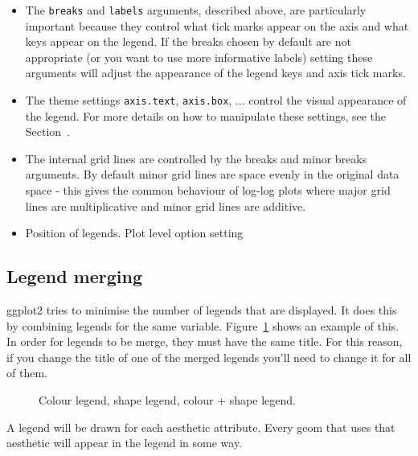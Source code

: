 \begin{itemize}
  \item The {\tt breaks} and {\tt labels} arguments, described above, are particularly important because they control what tick marks appear on the axis and what keys appear on the legend.  If the breaks chosen by default are not appropriate (or you want to use more informative labels) setting these arguments will adjust the appearance of the legend keys and axis tick marks.  
  
  \item The theme settings {\tt axis.text}, {\tt axis.box}, ... control the visual appearance of the legend.  For more details on how to manipulate these settings, see the Section~.

  \item The internal grid lines are controlled by the breaks and minor breaks arguments.  By default minor grid lines are space evenly in the original data space - this gives the common behaviour of log-log plots where major grid lines are multiplicative and minor grid lines are additive.
  
  \item Position of legends.  Plot level option setting 
  
\end{itemize}

\subsection{Legend merging}

ggplot2 tries to minimise the number of legends that are displayed.  It does this by combining legends for the same variable.  Figure~\ref{fig:legend-merge} shows an example of this.  In order for legends to be merge, they must have the same title.  For this reason, if you change the title of one of the merged legends you'll need to change it for all of them.

\begin{figure}[htbp]
  \centering
  \caption{Colour legend, shape legend, colour + shape legend.}
  \label{fig:legend-merge}
\end{figure}

A legend will be drawn for each aesthetic attribute.  Every geom that uses that aesthetic will appear in the legend in some way.

